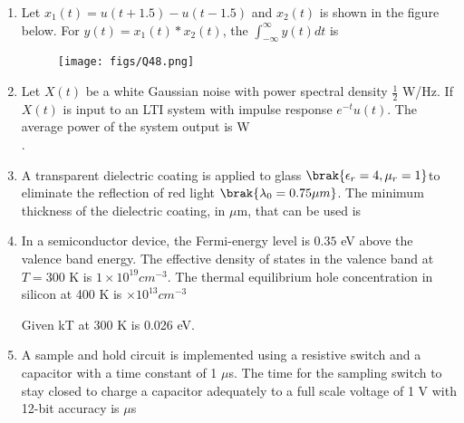\documentclass[a4paper, 11pt]{article}
\begin{document}
\begin{enumerate}
    \hfill{}
    
    \item Let $x_1(t) = u(t+1.5) - u(t-1.5)$ and $x_2(t)$ is shown in the figure below. For $y(t) = x_1(t) * x_2(t)$, the $\int_{-\infty}^{\infty} y(t) dt$ is \underline{\hspace{2cm}} 
    \begin{figure}[H]
        \centering
        \texttt{[image: figs/Q48.png]}
        \caption*{}
        \label{fig:q58}
    \end{figure}
    
    \hfill{}
    
    \item Let $X(t)$ be a white Gaussian noise with power spectral density $\frac{1}{2}$ W/Hz. If $X(t)$ is input to an LTI system with impulse response $e^{-t}u(t)$. The average power of the system output is \underline{\hspace{2cm}} W\\ .
    
    \hfill{}
    
    \item A transparent dielectric coating is applied to glass $\brak{\epsilon_r = 4, \mu_r = 1} $to eliminate the reflection of red light $\brak{\lambda_0 = 0.75 \mu m}$. The minimum thickness of the dielectric coating, in $\mu$m, that can be used is \underline{\hspace{2cm}} 
    
    \hfill{}
    
    \item In a semiconductor device, the Fermi-energy level is $0.35$ eV above the valence band energy. The effective density of states in the valence band at $T=300$ K is $1 \times 10^{19} cm^{-3}$. The thermal equilibrium hole concentration in silicon at 400 K is \underline{\hspace{2cm}} $\times 10^{13} cm^{-3}$ 
    
    Given kT at 300 K is 0.026 eV.
    
    \hfill{}
    
    \item A sample and hold circuit is implemented using a resistive switch and a capacitor with a time constant of 1 $\mu$s. The time for the sampling switch to stay closed to charge a capacitor adequately to a full scale voltage of 1 V with 12-bit accuracy is \underline{\hspace{2cm}} $\mu$s 
    

\end{enumerate}
\end{document}
